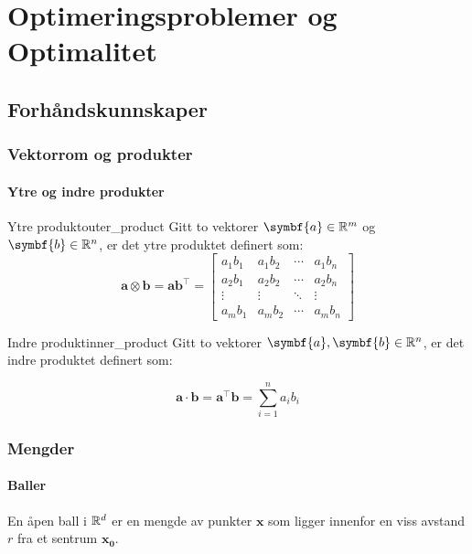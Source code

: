 \part{Optimeringsproblemer og Optimalitet}
\label{part:introduction}
\chapter{Forhåndskunnskaper}
\label{chap:mathematical_background}

\section{Vektorrom og produkter}

\subsection{Ytre og indre produkter}
\begin{definition}{Ytre produkt}{outer_product}
	Gitt to vektorer \( \symbf{a} \in \R^m \) og \( \symbf{b} \in \R^n \), er det ytre produktet definert som:
	\[
		\symbf{a} \otimes \symbf{b} = \symbf{a} \symbf{b}^\top =
		\begin{bmatrix}
			a_1b_1 & a_1b_2 & \cdots & a_1b_n \\
			a_2b_1 & a_2b_2 & \cdots & a_2b_n \\
			\vdots & \vdots & \ddots & \vdots \\
			a_mb_1 & a_mb_2 & \cdots & a_mb_n
		\end{bmatrix}
	\]
\end{definition}

\begin{definition}{Indre produkt}{inner_product}
	Gitt to vektorer \( \symbf{a}, \symbf{b} \in \R^n \), er det indre produktet definert som:

	\[
		\symbf{a} \cdot \symbf{b} = \symbf{a}^\top \symbf{b} = \sum_{i=1}^{n} a_i b_i
	\]

\end{definition}

\section{Mengder}

\subsection{Baller}
En åpen ball i \(\mathbb{R}^d\) er en mengde av punkter \(\mathbf{x}\) som ligger innenfor en viss avstand \(r\) fra et sentrum \(\mathbf{x_0}\).

